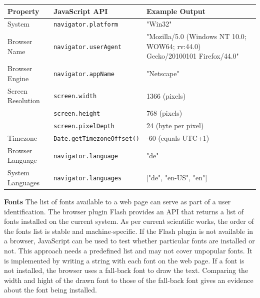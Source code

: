 \documentclass[article,colorback,accentcolor=tud9c,type=bsc]{tudthesis}
\begin{document}
	\renewcommand{\arraystretch}{1.2}
	\begin{tabular}{|l|l|p{}|}
		\hline
		\textbf{Property} & \textbf{JavaScript API} & \textbf{Example Output} \\
		\hline
		System & \texttt{navigator.platform} & "Win32" \\ \hline
		Browser Name & \texttt{navigator.userAgent} & "Mozilla/5.0 (Windows NT 10.0; WOW64; rv:44.0) Gecko/20100101 Firefox/44.0" \\ \hline
		Browser Engine & \texttt{navigator.appName} & "Netscape" \\ \hline
		Screen Resolution & \texttt{screen.width} & 1366 (pixels) \\
		& \texttt{screen.height} & 768 (pixels) \\
		& \texttt{screen.pixelDepth} & 24 (byte per pixel) \\ \hline
		Timezone & \texttt{Date.getTimezoneOffset()} & -60 (equals UTC+1) \\ \hline
		Browser Language & \texttt{navigator.language} & "de" \\ \hline
		System Languages & \texttt{navigator.languages} & ["de", "en-US", "en"] \\ \hline
	\end{tabular} 
	\newline
	\newline

	\textbf{Fonts} The list of fonts available to a web page can serve as part of a user identification. The browser plugin Flash provides an API that returns a list of fonts installed on the current system. As per current scientific works, the order of the fonts list is stable and machine-specific. %
	If the Flash plugin is not available in a browser, JavaScript can be used to test whether particular fonts are installed or not. This approach needs a predefined list and may not cover unpopular fonts. It is implemented by writing a string with each font on the web page. If a font is not installed, the browser uses a fall-back font to draw the text. Comparing the width and hight of the drawn font to those of the fall-back font gives an evidence about the font being installed. \\
	
\end{document}
